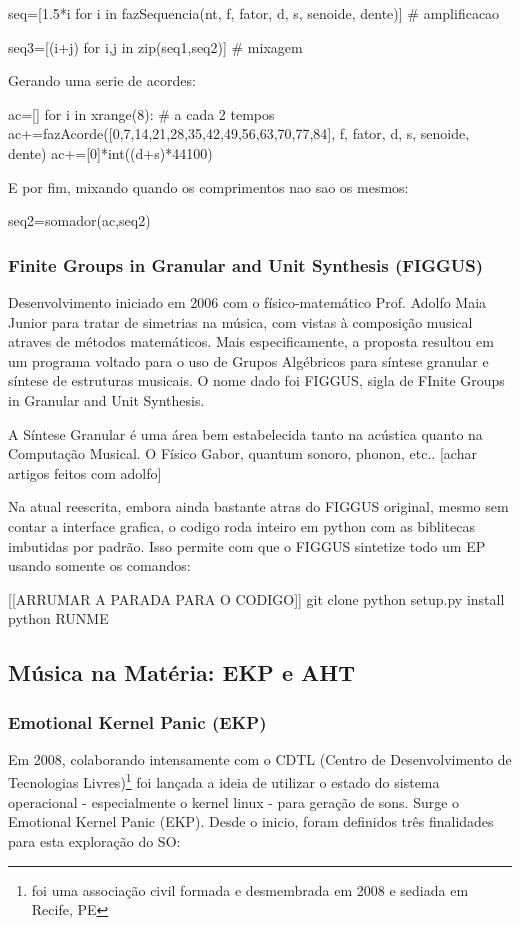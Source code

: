 seq=[1.5*i for i in fazSequencia(nt, f, fator, d, s, senoide, dente)] # amplificacao

seq3=[(i+j) for i,j in zip(seq1,seq2)] # mixagem

Gerando uma serie de acordes:

ac=[]
for i in xrange(8): # a cada 2 tempos
    ac+=fazAcorde([0,7,14,21,28,35,42,49,56,63,70,77,84], f, fator, d, s, senoide, dente)
    ac+=[0]*int((d+s)*44100)

E por fim, mixando quando os comprimentos nao sao os mesmos:

seq2=somador(ac,seq2)




\subsubsection{Finite Groups in Granular and Unit Synthesis (FIGGUS)}

Desenvolvimento iniciado em 2006 com o físico-matemático Prof. Adolfo Maia Junior para
tratar de simetrias na música, com vistas à composição musical atraves
de métodos matemáticos. Mais especificamente, a proposta resultou em
um programa voltado para o uso de Grupos Algébricos para síntese
granular e síntese de estruturas musicais. O nome dado
foi FIGGUS, sigla de FInite Groups in Granular and Unit Synthesis.

A Síntese Granular é uma área bem estabelecida tanto na acústica quanto
na Computação Musical. O Físico Gabor, quantum sonoro, phonon, etc..
[achar artigos feitos com adolfo]

Na atual reescrita, embora ainda bastante atras do FIGGUS original,
mesmo sem contar a interface grafica, o codigo roda inteiro em python
com as biblitecas imbutidas por padrão. Isso permite com que o FIGGUS
sintetize todo um EP usando somente os comandos:

[[ARRUMAR A PARADA PARA O CODIGO]]
git clone
python setup.py install
python RUNME




  \subsection{Música na Matéria: EKP e AHT}
      \subsubsection{Emotional Kernel Panic (EKP)}

Em 2008, colaborando intensamente com o CDTL
(Centro de Desenvolvimento de Tecnologias Livres)\footnote{foi uma associação civil formada e desmembrada em 2008 e sediada em Recife, PE}
foi lançada a ideia de utilizar o estado do sistema operacional - especialmente o kernel linux - para
geração de sons. Surge o Emotional Kernel Panic (EKP). Desde o inicio, foram definidos três finalidades
para esta exploração do SO:

